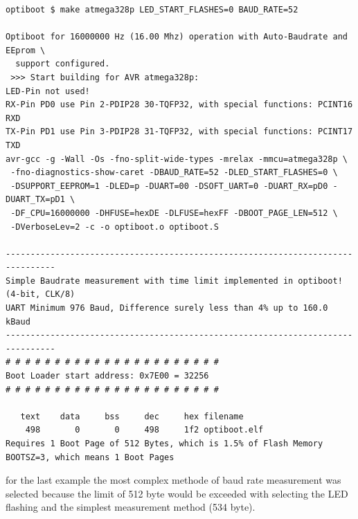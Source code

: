 \begin{verbatim}
optiboot $ make atmega328p LED_START_FLASHES=0 BAUD_RATE=52

Optiboot for 16000000 Hz (16.00 Mhz) operation with Auto-Baudrate and EEprom \
  support configured.
 >>> Start building for AVR atmega328p:
LED-Pin not used!
RX-Pin PD0 use Pin 2-PDIP28 30-TQFP32, with special functions: PCINT16 RXD
TX-Pin PD1 use Pin 3-PDIP28 31-TQFP32, with special functions: PCINT17 TXD
avr-gcc -g -Wall -Os -fno-split-wide-types -mrelax -mmcu=atmega328p \
 -fno-diagnostics-show-caret -DBAUD_RATE=52 -DLED_START_FLASHES=0 \
 -DSUPPORT_EEPROM=1 -DLED=p -DUART=00 -DSOFT_UART=0 -DUART_RX=pD0 -DUART_TX=pD1 \
 -DF_CPU=16000000 -DHFUSE=hexDE -DLFUSE=hexFF -DBOOT_PAGE_LEN=512 \
 -DVerboseLev=2 -c -o optiboot.o optiboot.S

--------------------------------------------------------------------------------
Simple Baudrate measurement with time limit implemented in optiboot! (4-bit, CLK/8)
UART Minimum 976 Baud, Difference surely less than 4% up to 160.0 kBaud
--------------------------------------------------------------------------------
# # # # # # # # # # # # # # # # # # # # # #
Boot Loader start address: 0x7E00 = 32256
# # # # # # # # # # # # # # # # # # # # # #

   text    data     bss     dec     hex filename
    498       0       0     498     1f2 optiboot.elf
Requires 1 Boot Page of 512 Bytes, which is 1.5% of Flash Memory
BOOTSZ=3, which means 1 Boot Pages

\end{verbatim}


for the last example the most complex methode of baud rate measurement
was selected because the limit of 512 byte would be exceeded with
selecting the LED flashing and the simplest measurement method (534 byte).

